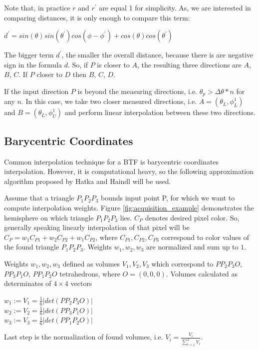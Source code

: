 Note that, in practice $r$ and $r^{'}$ are equal 1 for simplicity. As, we are interested in comparing distances, it is only enough to compare this term: 

{\centering$d^{'}=sin(\theta)sin(\theta^{'})cos(\phi-\phi^{'})+cos(\theta)cos(\theta^{'})$\\}

The bigger term  $d^{'}$, the smaller the overall distance, because there is are negative sign in the formula $d$. 
So, if $P$ is closer to $A$, the resulting three directions are $A$, $B$, $C$.
If $P$ closer to $D$ then $B$, $C$, $D$.

If the input direction $P$ is beyond the measuring directions, i.e. $\theta_p>\Delta \theta*n$ for any $n$.
In this case, we take two closer measured directions, i.e.  $A=(\theta_{L},\phi_{L}^1)$ and $B=(\theta_{L},\phi_{U}^1)$ and perform linear interpolation between these two directions.




\subsection{Barycentric Coordinates}
\label{chapter:barycentric}
Common interpolation technique for a BTF is barycentric coordinates interpolation. 
However, it is computational heavy, so the following approximation algorithm proposed by Hatka and Haindl \cite{btfblender} will be used.

Assume that a triangle $P_{1}P_{2}P_{3}$ bounds input point P, for which we want to compute interpolation weights. 
Figure \ref{fig:acquisition_example} demonstrates the hemisphere on which triangle $P_{1}P_{2}P_{3}$ lies.
$C_{P}$ denotes desired pixel color. 
So, generally speaking linearly interpolation of that pixel will be $C_{P}=w_{1}C_{P1} + w_{2}C_{P2} + w_{1}C_{P2}$, 
where $C_{P1},C_{P2},C_{P3}$ correspond to color values of the found triangle $P_{1}P_{2}P_{3}$. Weights $w_{1},w_{2},w_{3}$ are normalized and sum up to $1$.

Weights  $w_{1},w_{2},w_{3}$ defined as volumes $V_{1},V_{2},V_{3}$ which correspond to $PP_{2}P_{3}O$, $PP_{3}P_{1}O$, $PP_{1}P_{2}O$ tetrahedrons, where $O=(0,0,0)$.
 Volumes calculated as determinates of $4\times 4$ vectors

{\centering $w_{1}:=V_{1}=\frac{1}{6}\left | det(PP_{2}P_{3}O) \right |$ \\}
{\centering $w_{2}:=V_{2}=\frac{1}{6}\left | det(PP_{3}P_{1}O) \right |$ \\}
{\centering $w_{3}:=V_{3}=\frac{1}{6}\left | det(PP_{1}P_{2}O) \right |$ \\}

Last step is the normalization of found volumes, i.e. $V_{i}=\frac{V_{i}}{\sum_{i=1}^{3}V_{i}}$.
